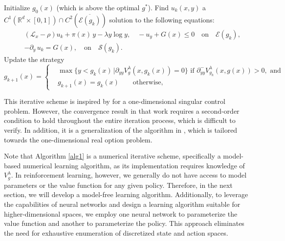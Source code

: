 \documentclass[11pt]{amsart}
\theoremstyle{plain}
\numberwithin{equation}{section}
\begin{document}
\begin{algorithm}[H]
\caption{Policy Iteration for Entropy-regularized Optimal Stopping (PI-$\lambda$-OS)} \label{alg1}
\begin{algorithmic}[1]
\State Initialize $g_0(x)$ (which is above the optimal $g^*$).
\State\label{line:33} Find $u_k(x,y) $  a ${C}^1(\mathbb{R}^d\times [0,1])\cap{C}^2\left(\overline{\mathcal{E}(g_k)}\right)$ solution to the following equations:
  \begin{eqnarray}
       &&(\mathcal{L}_x-\rho) u_k + \pi(x)\,y - \lambda y \log y, \quad -u_y +G(x)\leq 0 \quad \text{on} \quad\mathcal{E}(g_k),\label{eq:uk-1}\\
     && -\partial_y\, u_k = G(x), \quad \text{on}\quad \mathcal{S}(g_k).\label{eq:uk-2}
  \end{eqnarray}
 \State \label{line:44} Update the strategy
 \begin{equation*}
      {g}_{k+1}(x) =
      \begin{cases}
       & \max \Big\{y< g_k(x)\,\Big| \partial_{yy} V^\lambda_{g}(x,g_k(x)) = 0 \Big\} \,\,\text{if} \,\, \partial^-_{yy} V^\lambda_{g_k}(x,g(x))>0, \text{ and } \\
    &  {g}_{k+1}(x) = g_k (x)  \qquad \text{otherwise,}  
      \end{cases}
 \end{equation*}
\EndFor
\end{algorithmic}
\end{algorithm}
 This iterative scheme is inspired by \cite{kumar2004numerical} for a one-dimensional singular control problem. However, the convergence result in that work requires a second-order condition to hold throughout the entire iteration process, which is difficult to verify. In addition, it is a generalization of the algorithm in \cite{dianetti2026reinforcement}, which is tailored towards the one-dimensional real option problem.

Note that Algorithm \ref{alg1} is a numerical iterative scheme, specifically a model-based numerical learning algorithm, as its implementation requires knowledge of $V^\lambda_g$. In reinforcement learning, however, we generally do not have access to model parameters or the value function for any given policy. Therefore, in the next section, we will develop a model-free learning algorithm. Additionally, to leverage the capabilities of neural networks and design a learning algorithm suitable for higher-dimensional spaces, we employ one neural network to parameterize the value function and another to parameterize the policy. This approach eliminates the need for exhaustive enumeration of discretized state and action spaces.
\end{document}
